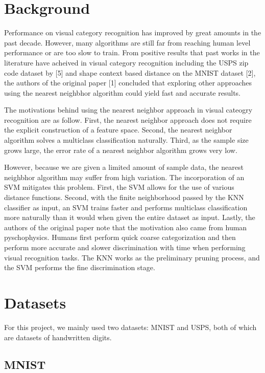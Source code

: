 \documentclass[11pt,letterpaper]{article}
\begin{document}
\section{Background}

Performance on visual category recognition has improved by great amounts in the past decade. However, many algorithms are still far from reaching human level performance or are too slow to train. From positive results that past works in the literature have acheived in visual category recognition including the USPS zip code dataset by [5] and shape context based distance on the MNIST dataset [2], the authors of the original paper [1] concluded that exploring other approaches using the nearest neighbhor algorithm could yield fast and accurate results.

The motivations behind using the nearest neighbor approach in visual cateogry recognition are as follow. First, the nearest neighbor approach does not require the explicit construction of a feature space. Second, the nearest neighbor algorithm solves a multiclass classification naturally. Third, as the sample size grows large, the error rate of a nearest neighbor algorithm grows very low.

However, because we are given a limited amount of sample data, the nearest neighbhor algorithm may suffer from high variation. The incorporation of an SVM mitigates this problem. First, the SVM allows for the use of various distance functions. Second, with the finite neighborhood passed by the KNN classifier as input, an SVM trains faster and performs multiclass classification more naturally than it would when given the entire dataset as input. Lastly, the authors of the original paper note that the motivation also came from human pyschophysics. Humans first perform quick coarse categorization and then perform more accurate and slower discrimination with time when performing visual recognition tasks. The KNN works as the preliminary pruning process, and the SVM performs the fine discrimination stage.

\section{Datasets}

For this project, we mainly used two datasets: MNIST and USPS, both of which are datasets of handwritten digits.

\subsection{MNIST}
\end{document}
